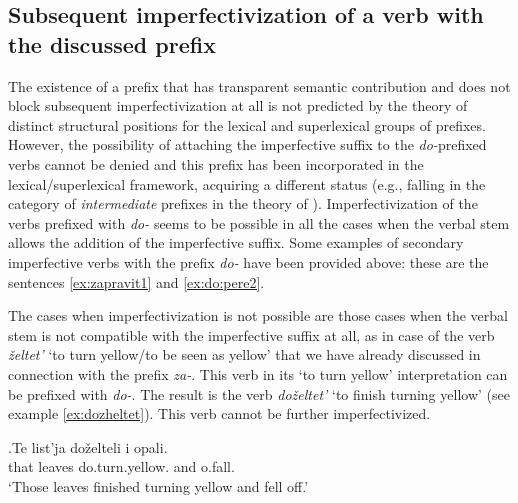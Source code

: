 \subsection{Subsequent imperfectivization of a verb with the discussed prefix}
The existence of a prefix that has transparent semantic contribution and does not block subsequent imperfectivization at all is not predicted by the theory of distinct structural positions for the lexical and superlexical groups of prefixes. However, the possibility of attaching the imperfective suffix to the \textit{do-}prefixed verbs cannot be denied and this prefix has been incorporated in the lexical/superlexical framework, acquiring a different status (e.g., falling in the category of \textit{intermediate} prefixes in the theory of \citealt{Tatevosov:07}). Imperfectivization of the verbs prefixed with \textit{do-} seems to be possible in all the cases when the verbal stem allows the addition of the imperfective suffix. Some examples of secondary imperfective verbs with the prefix \textit{do-} have been provided above: these are the sentences \ref{ex:zapravit1} and \ref{ex:do:pere2}.

The cases when imperfectivization is not possible are those cases when the verbal stem is not compatible with the imperfective suffix at all, as in case of the verb \textit{\v{z}eltet'} `to turn yellow/to be seen as yellow' that we have already discussed in connection with the prefix \textit{za-}. This verb in its `to turn yellow' interpretation can be prefixed with \textit{do-}. The result is the verb \textit{do\v{z}eltet'} `to finish turning yellow' (see example \ref{ex:dozheltet}). This verb cannot be further imperfectivized. 

\exg.\label{ex:dozheltet}Te list'ja do\v{z}elteli i opali.\\
that leaves do.turn.yellow. and o.fall.\\
\trans `Those leaves finished turning yellow and fell off.'\\

